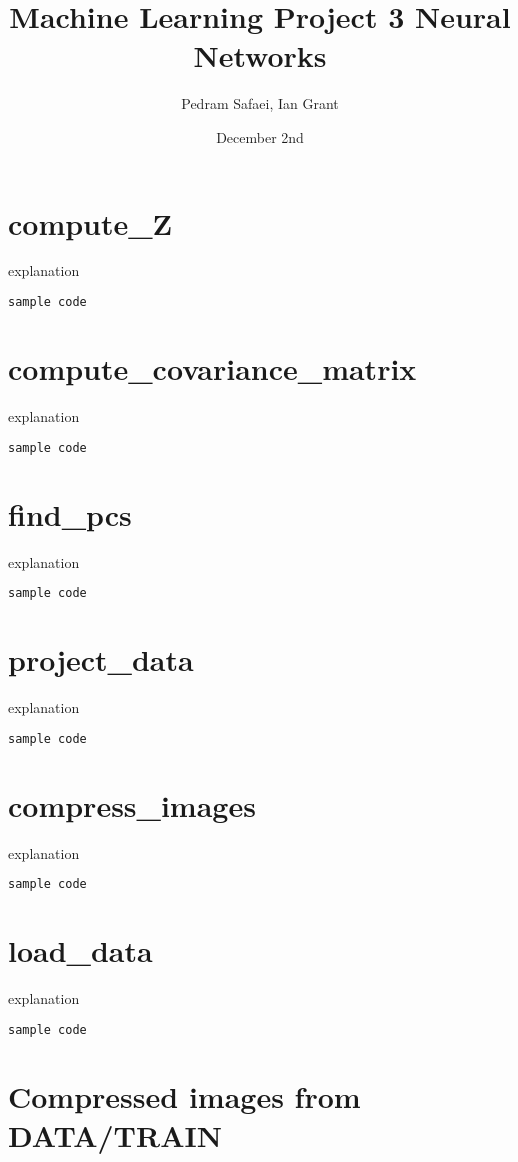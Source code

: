 \documentclass{article}
\title{Machine Learning Project 3 Neural Networks}
\author{Pedram Safaei, Ian Grant }
\date{December 2nd}
\begin{document}
\maketitle

\section{compute\_Z}
explanation
\begin{lstlisting}[language=Python]
sample code 
\end{lstlisting}


\section{compute\_covariance\_matrix}
explanation
\begin{lstlisting}[language=Python]
sample code 
\end{lstlisting}

\section{find\_pcs}
explanation
\begin{lstlisting}[language=Python]
sample code 
\end{lstlisting}

\section{project\_data}
explanation
\begin{lstlisting}[language=Python]
sample code 
\end{lstlisting}

\section{compress\_images}
explanation
\begin{lstlisting}[language=Python]
sample code 
\end{lstlisting}

\section{load\_data}
explanation
\begin{lstlisting}[language=Python]
sample code 
\end{lstlisting}

\section{Compressed images from DATA/TRAIN}
\end{document}
